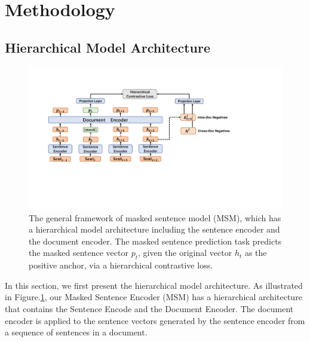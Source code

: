 \documentclass{article} %
\begin{document}
\section{Methodology}



\subsection{Hierarchical Model Architecture}
\begin{figure}
    \centering
    \includegraphics[width=0.9\linewidth]{pics/model.pdf}
    \caption{The general framework of masked sentence model (MSM), which has a hierarchical model architecture including the sentence encoder and the document encoder. The masked sentence prediction task predicts the masked sentence vector $p_t$, given the original vector $h_t$ as the positive anchor, via a hierarchical contrastive loss. }
    \label{fig:modelx}
\end{figure}




In this section, we first present the hierarchical model architecture. 
As illustrated in Figure.\ref{fig:modelx}, our Masked Sentence Encoder (MSM) has a hierarchical architecture that contains the Sentence Encode and the Document Encoder. The document encoder is applied to the sentence vectors generated by the sentence encoder from a sequence of sentences in a document.
\end{document}
